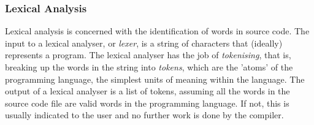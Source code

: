 \documentclass{article}
\begin{document}
\subsubsection{Lexical Analysis}
Lexical analysis is concerned with the identification of words in source code. The input to a lexical analyser, or \emph{lexer}, is a string of characters that (ideally) represents a program. The lexical analyser has the job of \emph{tokenising}, that is, breaking up the words in the string into \emph{tokens}, which are the 'atoms' of the programming language, the simplest units of meaning within the language. The output of a lexical analyser is a list of tokens, assuming all the words in the source code file are valid words in the programming language. If not, this is usually indicated to the user and no further work is done by the compiler.
\end{document}
